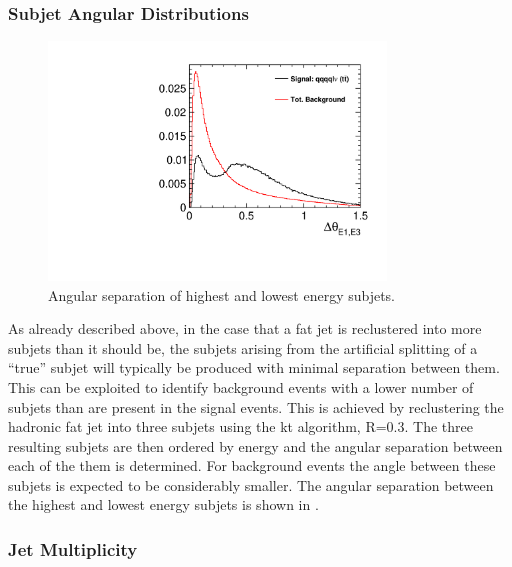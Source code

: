 \subsubsection{Subjet Angular Distributions}
\label{subjAngular}
\begin{figure}
  \centering
  \includegraphics[width=0.8\textwidth]{TopAnalysis/figures/HighELowEDira.pdf}
  \caption[Angular separation of highest and lowest energy subjets]{Angular separation of highest and lowest energy subjets.}
  \label{fig:angularrelations}
\end{figure}


As already described above, in the case that a fat jet is reclustered into more subjets than it should be, the subjets arising from the artificial splitting of a ``true'' subjet will typically be produced with minimal separation between them. This can be exploited to identify background events with a lower number of subjets than are present in the signal events. This is achieved by reclustering the hadronic fat jet into three subjets using the kt algorithm, R=0.3. The three resulting subjets are then ordered by energy and the angular separation between each of the them is determined. For background events the angle between these subjets is expected to be considerably smaller. The angular separation between the highest and lowest energy subjets is shown in .



\subsubsection{Jet Multiplicity}
\label{Jet Multiplicity}


